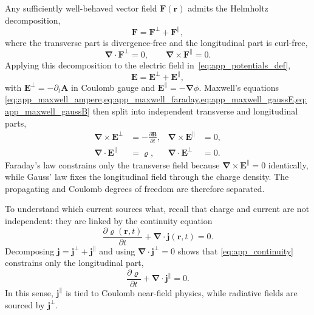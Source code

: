 Any sufficiently well-behaved vector field $\boldsymbol{F}(\boldsymbol{r})$ admits the Helmholtz decomposition,
\begin{equation*}
	\boldsymbol{F} = \boldsymbol{F}^{\perp} + \boldsymbol{F}^{\parallel},
\end{equation*}
where the transverse part is divergence-free and the longitudinal part is curl-free,
\begin{equation*}
	\boldsymbol{\nabla}\cdot\boldsymbol{F}^{\perp}=0,\qquad \boldsymbol{\nabla}\times\boldsymbol{F}^{\parallel}=0.
\end{equation*}
Applying this decomposition to the electric field in~\autoref{eq:app_potentials_def},
\begin{equation*}
	\boldsymbol{E} = \boldsymbol{E}^{\perp} + \boldsymbol{E}^{\parallel},
\end{equation*}
with $\boldsymbol{E}^{\perp} = -\partial_t \boldsymbol{A}$ in Coulomb gauge and $\boldsymbol{E}^{\parallel} = -\boldsymbol{\nabla}\phi$. Maxwell's equations \cref{eq:app_maxwell_ampere,eq:app_maxwell_faraday,eq:app_maxwell_gaussE,eq:app_maxwell_gaussB} then split into independent transverse and longitudinal parts,
\begin{align*}
	\boldsymbol{\nabla}\times\boldsymbol{E}^{\perp}     & = -\frac{\partial \boldsymbol{B}}{\partial t},
	                                                    &
	\boldsymbol{\nabla}\times\boldsymbol{E}^{\parallel} & = 0,
	\\
	\boldsymbol{\nabla}\cdot\boldsymbol{E}^{\parallel}  & = \varrho,
	                                                    &
	\boldsymbol{\nabla}\cdot\boldsymbol{E}^{\perp}      & = 0.
\end{align*}
Faraday's law constrains only the transverse field because $\boldsymbol{\nabla}\times\boldsymbol{E}^{\parallel}=0$ identically, while Gauss' law fixes the longitudinal field through the charge density. The propagating and Coulomb degrees of freedom are therefore separated.

\medskip

To understand which current sources what, recall that charge and current are not independent: they are linked by the continuity equation
\begin{equation}
	\frac{\partial \varrho(\boldsymbol{r},t)}{\partial t} + \boldsymbol{\nabla}\cdot\boldsymbol{j}(\boldsymbol{r},t)=0.
	\label{eq:app_continuity}
\end{equation}
Decomposing $\boldsymbol{j}=\boldsymbol{j}^{\perp}+\boldsymbol{j}^{\parallel}$ and using $\boldsymbol{\nabla}\cdot\boldsymbol{j}^{\perp}=0$ shows that \autoref{eq:app_continuity} constrains only the longitudinal part,
\begin{equation*}
	\frac{\partial \varrho}{\partial t} + \boldsymbol{\nabla}\cdot\boldsymbol{j}^{\parallel}=0.
\end{equation*}
In this sense, $\boldsymbol{j}^{\parallel}$ is tied to Coulomb near-field physics, while radiative fields are sourced by $\boldsymbol{j}^{\perp}$.

